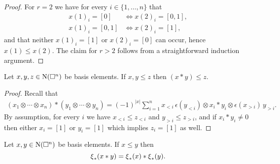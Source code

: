 \begin{proof}
	For $r = 2$ we have for every $i \in \{1, \dots, n\}$ that
	\begin{align*}
	x(1)_i = [0]   & \iff x(2)_i = [0,1], \\
	x(1)_i = [0,1] & \iff x(2)_i = [1],
	\end{align*}
	and that neither $x(1)_i = [1]$ or $x(2)_i = [0]$ can occur, hence $x(1) \leq x(2)$.
	The claim for $r > 2$ follows from a straightforward induction argument.
\end{proof}

\begin{lemma}
	Let $x, y, z \in \operatorname{N}(\square^n)$ be basis elements.
	If $x, y \leq z$ then $(x \ast y) \leq z$.
\end{lemma}

\begin{proof}
	Recall that
	\begin{align*}
	(x_1 \otimes \cdots \otimes x_n) \ast (y_1 \otimes \cdots \otimes y_n) =
	(-1)^{|x|} \sum_{i=1}^n x_{<i}\, \epsilon(y_{<i}) \otimes x_i \ast y_i \otimes \epsilon(x_{>i}) \, y_{>i}.
	\end{align*}
	By assumption, for every $i$ we have $x_{<i} \leq z_{<i}$ and $y_{>i} \leq z_{>i}$, and if $x_i \ast y_i \neq 0$ then either $x_i = [1]$ or $y_i = [1]$ which implies $z_i = [1]$ as well.
\end{proof}

\begin{lemma}
	Let $x, y \in \operatorname{N}(\square^n)$ be basis elements.
	If $x \leq y$ then
	\begin{equation} \label{e:cs collapse as algebra map}
	\operatorname{\xi}_\ast(x \ast y) = \operatorname{\xi}_\ast(x) \ast \operatorname{\xi}_\ast(y).
	\end{equation}
\end{lemma}

